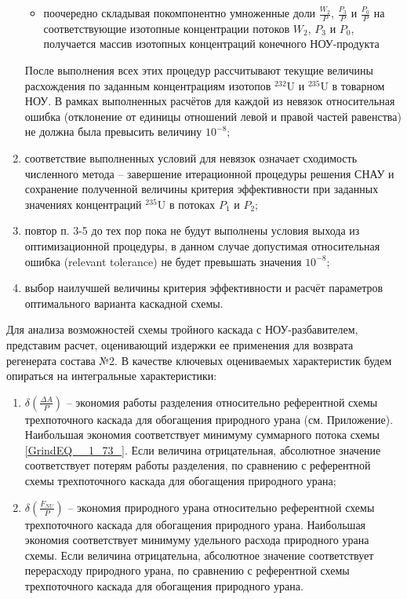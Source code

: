 \begin{enumerate}
\begin{itemize}
        \item поочередно складывая покомпонентно умноженные доли $\frac{W_{2}}{P}$, $\frac{P_{3}}{P}$ и $\frac{P_{0}}{P}$ на соответствующие изотопные концентрации потоков $W_2$, $P_3$ и $P_0$, получается массив изотопных концентраций конечного НОУ-продукта
        \end{itemize}
    После выполнения всех этих процедур рассчитывают текущие величины расхождения по заданным концентрациям изотопов $^{232}$U и $^{235}$U в товарном НОУ. В рамках выполненных расчётов для каждой из невязок относительная ошибка (отклонение от единицы отношений левой и правой частей равенства) не должна была превысить величину $10^{-8}$;
    \item соответствие выполненных условий для невязок означает сходимость численного метода -- завершение итерационной процедуры решения СНАУ и сохранение полученной величины критерия эффективности при заданных значениях концентраций $^{235}$U в потоках $P_1$ и $P_2$;
    \item повтор п. 3-5 до тех пор пока не будут выполнены условия выхода из оптимизационной процедуры, в данном случае допустимая относительная ошибка (relevant tolerance) не будет превышать значения $10^{-8}$;
    \item выбор наилучшей величины критерия эффективности и расчёт параметров оптимального варианта каскадной схемы.
\end{enumerate}




Для анализа возможностей схемы тройного каскада с НОУ-разбавителем, представим расчет, оценивающий издержки ее применения для возврата регенерата состава №2. 
В качестве ключевых оцениваемых характеристик будем опираться на интегральные характеристики:
\begin{enumerate}
    \item $\delta(\frac{\Delta A}{P})$ -- экономия работы разделения относительно референтной схемы трехпоточного каскада для обогащения природного урана (см. Приложение). Наибольшая экономия соответствует минимуму суммарного потока схемы \ref{GrindEQ__1_73_}. Если величина отрицательная, абсолютное значение соответствует потерям работы разделения, по сравнению с референтной схемы трехпоточного каскада для обогащения природного урана;
    \item $\delta(\frac{F_{NU}}{P})$ -- экономия природного урана относительно референтной схемы трехпоточного каскада для обогащения природного урана.  Наибольшая экономия соответствует минимуму удельного расхода природного урана схемы. Если величина отрицательна, абсолютное значение соответствует перерасходу природного урана, по сравнению с референтной схемы трехпоточного каскада для обогащения природного урана.
\end{enumerate}

